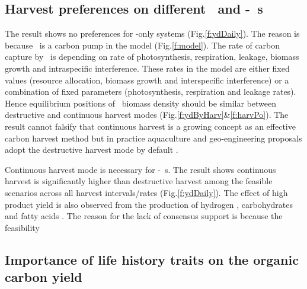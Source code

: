 \documentclass[../thesis.tex]{subfiles} %
\begin{document}
\subsection{Harvest preferences on different \phy\ and \phy-\bac\ \pbs s}
The result shows no preferences for \phy-only systems (Fig.\ref{f:ydDaily}).  The reason is because \phy\ is a carbon pump in the model (Fig.\ref{f:model}).  The rate of carbon capture by \phy\ is depending on rate of photosynthesis, respiration, leakage, biomass growth and intraspecific interference.  These rates in the model are either fixed values (resource allocation, biomass growth and interspecific interference) or a combination of fixed parameters (photosynthesis, respiration and leakage rates).  Hence equilibrium positions of \phy\ biomass density should be similar between destructive and continuous harvest modes (Fig.\ref{f:ydByHarv}\&\ref{f:harvPo}).  The result cannot falsify that continuous harvest is a growing concept as an effective carbon harvest method \autocite{fuentes2016impact} but in practice aquaculture and geo-engineering proposals adopt the destructive harvest mode by default \autocite{lawrence2014efficiency,krause2016substantial}.

Continuous harvest mode is necessary for \phy-\bac\ \pbs s.  The result shows continuous harvest is significantly higher than destructive harvest among the feasible scenarios across all harvest intervals/rates (Fig.\ref{f:ydDaily}).  The effect of high product yield is also observed from the production of hydrogen \autocite{kim2008anaerobic}, carbohydrates \autocite{choix2012enhanced1,choix2012enhanced2} and fatty acids \autocite{leyva2014accumulation}.  The reason for the lack of consensus support is because the feasibility

\subsection{Importance of life history traits on the organic carbon yield}
\end{document}
